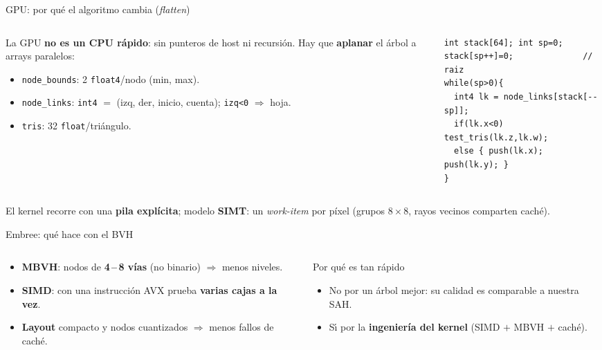 \documentclass[aspectratio=169,11pt]{beamer}
\newcommand{\hl}[1]{{\color{primdk}\textbf{#1}}}
\begin{document}
\begin{frame}[fragile]{GPU: por qu\'e el algoritmo cambia (\emph{flatten})}
\begin{columns}[c]
\begin{column}{0.5\textwidth}
\small La GPU \hl{no es un CPU r\'apido}: sin punteros de host ni recursi\'on.
Hay que \hl{aplanar} el \'arbol a arrays paralelos:
\begin{itemize}\itemsep3pt
  \item \texttt{node\_bounds}: 2 \texttt{float4}/nodo (min, max).
  \item \texttt{node\_links}: \texttt{int4} $=$ (izq, der, inicio, cuenta); \texttt{izq<0} $\Rightarrow$ hoja.
  \item \texttt{tris}: 32 \texttt{float}/tri\'angulo.
\end{itemize}
\end{column}
\begin{column}{0.5\textwidth}
\begin{lstlisting}
int stack[64]; int sp=0;
stack[sp++]=0;              // raiz
while(sp>0){
  int4 lk = node_links[stack[--sp]];
  if(lk.x<0) test_tris(lk.z,lk.w);
  else { push(lk.x); push(lk.y); }
}
\end{lstlisting}
\end{column}
\end{columns}
\vspace{16pt}
El kernel recorre con una \hl{pila expl\'icita}; modelo \hl{SIMT}: un
\emph{work-item} por p\'ixel (grupos $8\times8$, rayos vecinos comparten cach\'e).
\end{frame}

\begin{frame}{Embree: qu\'e hace con el BVH}
\begin{columns}[c]
\begin{column}{0.54\textwidth}
\begin{itemize}\itemsep3pt
  \item \hl{MBVH}: nodos de \hl{4\,--\,8 v\'ias} (no binario) $\Rightarrow$ menos niveles.
  \item \hl{SIMD}: con una instrucci\'on AVX prueba \hl{varias cajas a la vez}.
  \item \hl{Layout} compacto y nodos cuantizados $\Rightarrow$ menos fallos de cach\'e.
\end{itemize}
\end{column}
\begin{column}{0.46\textwidth}
\begin{block}{Por qu\'e es tan r\'apido}
\begin{itemize}\itemsep2pt
  \item \alert{No} por un \'arbol mejor: su calidad es comparable a nuestra SAH.
  \item S\'\i{} por la \hl{ingenier\'ia del kernel} (SIMD $+$ MBVH $+$ cach\'e).
\end{itemize}
\end{block}
\end{column}
\end{columns}
\end{frame}
\end{document}
